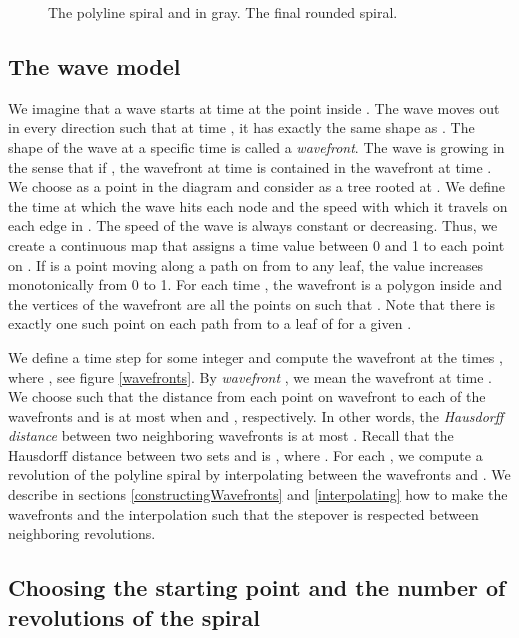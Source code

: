 \documentclass[3p]{elsarticle}
\begin{document}
\begin{figure*}
\centering
{}\quad
{}
\caption{
 The polyline spiral and  in gray.
 The final rounded spiral.
}
\label{firstSpirals}
\end{figure*}

\subsection{The wave model}\label{waveModel}

We imagine that a wave starts at time  at the point  inside . The wave moves out
in every direction such that at time , it has exactly the same shape as .
The shape of the wave at a specific time is called a \emph{wavefront}.
The wave is growing in the sense that if ,
the wavefront at time  is contained in the wavefront at time .
We choose  as a point in the diagram  and consider  as a tree
rooted at . We define the time
at which the wave hits each node and the speed with which it travels on each edge in .
The speed of the wave is always constant or decreasing.
Thus, we create a continuous map  that assigns
a time value between 0 and 1 to each point on . If  is a point moving along a path
on  from  to any leaf,
the value  increases monotonically from 0 to 1.
For each time , the wavefront is a polygon inside  and the vertices of the wavefront
are all the points  on  such that . Note that there is exactly one such point
on each path from  to a leaf of  for a given .

We define a time step  for some
integer  and compute the wavefront at the times
, where ,
see figure \ref{wavefronts}.
By \emph{wavefront} , we mean the wavefront at time .
We choose  such that the distance from each point on
wavefront  to each of the wavefronts  and 
is at most  when  and , respectively.
In other words, the \emph {Hausdorff distance} between
two neighboring wavefronts is at most .
Recall that the Hausdorff distance between two sets  and  is
, where .
For each ,
we compute a revolution of the polyline spiral by interpolating between the wavefronts 
and . We describe in sections \ref{constructingWavefronts}
and \ref{interpolating} how to make the wavefronts and the interpolation such
that the stepover is respected between neighboring revolutions.

\subsection{Choosing the starting point  and the number of revolutions of the spiral}\label{startingPoint}
\end{document}
